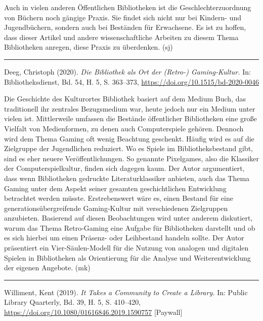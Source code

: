 \documentclass[a4paper,
fontsize=11pt,
oneside,
numbers=noperiodatend,
parskip=half-,
bibliography=totoc,
final
]{scrartcl}
\begin{document}
Auch in vielen anderen Öffentlichen Bibliotheken ist die
Geschlechterzuordnung von Büchern noch gängige Praxis. Sie findet sich
nicht nur bei Kindern- und Jugendbüchern, sondern auch bei Beständen für
Erwachsene. Es ist zu hoffen, dass dieser Artikel und andere
wissenschaftliche Arbeiten zu diesem Thema Bibliotheken anregen, diese
Praxis zu überdenken. (sj)

\begin{center}\rule{0.5\linewidth}{0.5pt}\end{center}

Deeg, Christoph (2020). \emph{Die Bibliothek als Ort der (Retro-)
Gaming-Kultur.} In: Bibliotheksdienst, Bd. 54, H. 5, S. 363--373,
\url{https://doi.org/10.1515/bd-2020-0046}

Die Geschichte des Kulturortes Bibliothek basiert auf dem Medium Buch,
das traditionell ihr zentrales Bezugsmedium war, heute jedoch nur ein
Medium unter vielen ist. Mittlerweile umfassen die Bestände öffentlicher
Bibliotheken eine große Vielfalt von Medienformen, zu denen auch
Computerspiele gehören. Dennoch wird dem Thema Gaming oft wenig
Beachtung geschenkt. Häufig wird es auf die Zielgruppe der Jugendlichen
reduziert. Wo es Spiele im Bibliotheksbestand gibt, sind es eher neuere
Veröffentlichungen. So genannte Pixelgames, also die Klassiker der
Computerspielkultur, finden sich dagegen kaum. Der Autor argumentiert,
dass wenn Bibliotheken gedruckte Literaturklassiker anbieten, auch das
Thema Gaming unter dem Aspekt seiner gesamten geschichtlichen
Entwicklung betrachtet werden müsste. Erstrebenswert wäre es, einen
Bestand für eine generationsübergreifende Gaming-Kultur mit
verschiedenen Zielgruppen anzubieten. Basierend auf diesen Beobachtungen
wird unter anderem diskutiert, warum das Thema Retro-Gaming eine Aufgabe
für Bibliotheken darstellt und ob es sich hierbei um einen Präsenz- oder
Leihbestand handeln sollte. Der Autor präsentiert ein Vier-Säulen-Modell
für die Nutzung von analogen und digitalen Spielen in Bibliotheken als
Orientierung für die Analyse und Weiterentwicklung der eigenen Angebote.
(mk)

\begin{center}\rule{0.5\linewidth}{0.5pt}\end{center}

Williment, Kent (2019). \emph{It Takes a Community to Create a Library.}
In: Public Library Quarterly, Bd. 39, H. 5, S. 410--420,
\url{https://doi.org/10.1080/01616846.2019.1590757} {[}Paywall{]}
\end{document}
